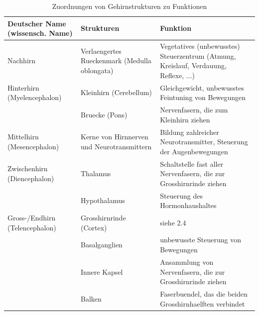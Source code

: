 \begin{table}[!h]
\caption{Zuordnungen von Gehirnstrukturen zu Funktionen}
\label{Tabelle1}
\begin{tabularx}{\textwidth}{XXX}
\hline\hline

\textbf{Deutscher Name} \newline\textbf{(wissensch. Name)}\newline              & \textbf{Strukturen}                                    & \textbf{Funktion}                                                                             \\ \hline
Nachhirn                                      & Verlaengertes Rueckenmark (Medulla oblongata) & Vegetatives (unbewusstes) Steuerzentrum (Atmung, Kreislauf, Verdauung, Reflexe, ...) \\ \hline
Hinterhirn \newline(Myelencephalon)               & Kleinhirn (Cerebellum)                        & Gleichgewicht, unbewusstes Feintuning von Bewegungen                                 \\ \cline{2-3} 
                                          & Bruecke (Pons)                                & Nervenfasern, die zum Kleinhirn ziehen                                               \\ \hline
Mittelhirn \newline(Mesencephalon)                    & Kerne von Hirnnerven und Neurotransmittern    & Bildung zahlreicher Neurotransmitter, Steuerung der Augenbewegungen                  \\ \hline
Zwischenhirn \newline(Diencephalon)                   & Thalamus                                      & Schaltstelle fast aller Nervenfasern, die zur Grosshirnrinde ziehen                   \\ \cline{2-3} 
                                              & Hypothalamus                                  & Steuerung des Hormonhaushaltes                                                       \\ \hline
Gross-/Endhirn \newline(Telencephalon)                 & Grosshirnrinde (Cortex)                        & siehe 2.4                                                                            \\ \cline{2-3} 
                                              & Basalganglien                                 & unbewusste Steuerung von Bewegungen                                                  \\ \cline{2-3} 
                                              & Innere Kapsel                                 & Ansammlung von Nervenfasern, die zur Grosshirnrinde ziehen                            \\ \cline{2-3} 
                                              & Balken                                        & Faserbuendel, das die beiden Grosshirnhaelften verbindet                              \\ \hline\hline
\end{tabularx}
\end{table}

